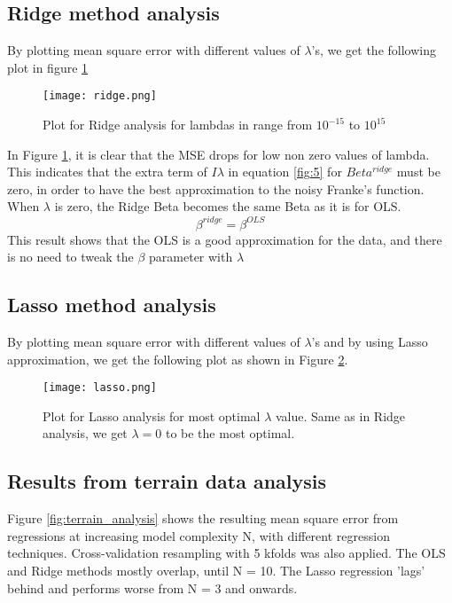 \documentclass[reprint,english,notitlepage]{revtex4-1}  %
\begin{document}
\subsection{Ridge method analysis}
By plotting mean square error with different values of $\lambda$'s, we get the following plot in figure \ref{fig:ridge}

\begin{figure}[h!]
    \centering
    \texttt{[image: ridge.png]}
    \caption{Plot for Ridge analysis for lambdas in range from $10^{-15}$ to $10^{15}$}
    \label{fig:ridge}
\end{figure}

In Figure \ref{fig:ridge}, it is clear that the MSE drops for low non zero values of lambda. This indicates that the extra term of $I\lambda$ in equation \ref{fig:5} for $Beta^{ridge}$ must be zero, in order to have the best approximation to the noisy Franke's function. When $\lambda$ is zero, the Ridge Beta becomes the same Beta as it is for OLS. 
$$\beta^{ridge} = \beta^{OLS}$$
This result shows that the OLS is a good approximation for the data, and there is no need to tweak the $\beta$ parameter with $\lambda$

\subsection{Lasso method analysis}
By plotting mean square error with different values of $\lambda$'s and by using Lasso approximation, we get the following plot as shown in Figure \ref{fig:lasso}.

\begin{figure}[h!]
    \centering
    \texttt{[image: lasso.png]}
    \caption{Plot for Lasso analysis for most optimal $\lambda$ value. Same as in Ridge analysis, we get $\lambda = 0$ to be the most optimal.}
    \label{fig:lasso}
\end{figure}

\subsection{Results from terrain data analysis}

Figure \ref{fig:terrain_analysis} shows the resulting mean square error from regressions at increasing model complexity N, with different regression techniques. Cross-validation resampling with 5 kfolds was also applied. The OLS and Ridge methods mostly overlap, until N = 10. The Lasso regression 'lags' behind and performs worse from N = 3 and onwards.
\end{document}

